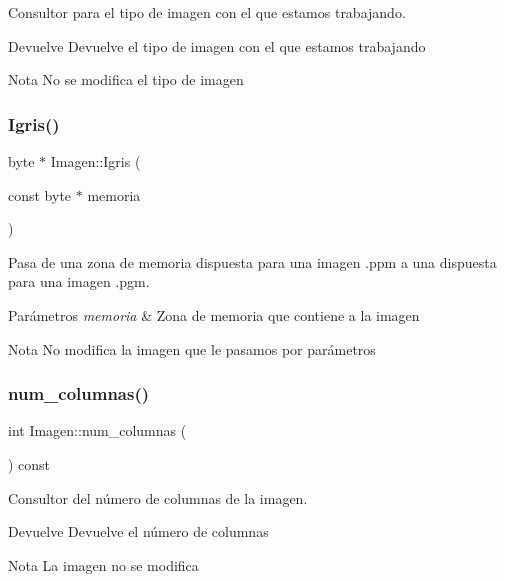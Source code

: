 Consultor para el tipo de imagen con el que estamos trabajando. 

\begin{DoxyReturn}{Devuelve}
Devuelve el tipo de imagen con el que estamos trabajando 
\end{DoxyReturn}
\begin{DoxyNote}{Nota}
No se modifica el tipo de imagen 
\end{DoxyNote}
\mbox{\label{classImagen_a77d5744cb232e2de19e3941eae893961}} 
\subsubsection{\texorpdfstring{Igris()}{Igris()}}
{\footnotesize\ttfamily byte $\ast$ Imagen\+::\+Igris (\begin{DoxyParamCaption}\item[{const byte $\ast$}]{memoria }\end{DoxyParamCaption})}



Pasa de una zona de memoria dispuesta para una imagen .ppm a una dispuesta para una imagen .pgm. 


\begin{DoxyParams}{Parámetros}
{\em memoria} & Zona de memoria que contiene a la imagen \\
\hline
\end{DoxyParams}
\begin{DoxyNote}{Nota}
No modifica la imagen que le pasamos por parámetros 
\end{DoxyNote}
\mbox{\label{classImagen_ac28d55c18064aea2a65e6fcf51d86191}} 
\subsubsection{\texorpdfstring{num\+\_\+columnas()}{num\_columnas()}}
{\footnotesize\ttfamily int Imagen\+::num\+\_\+columnas (\begin{DoxyParamCaption}{ }\end{DoxyParamCaption}) const}



Consultor del número de columnas de la imagen. 

\begin{DoxyReturn}{Devuelve}
Devuelve el número de columnas 
\end{DoxyReturn}
\begin{DoxyNote}{Nota}
La imagen no se modifica 
\end{DoxyNote}
\mbox{\label{classImagen_a4cb4faa04f5e2913965e43a6a65acfd1}} 
